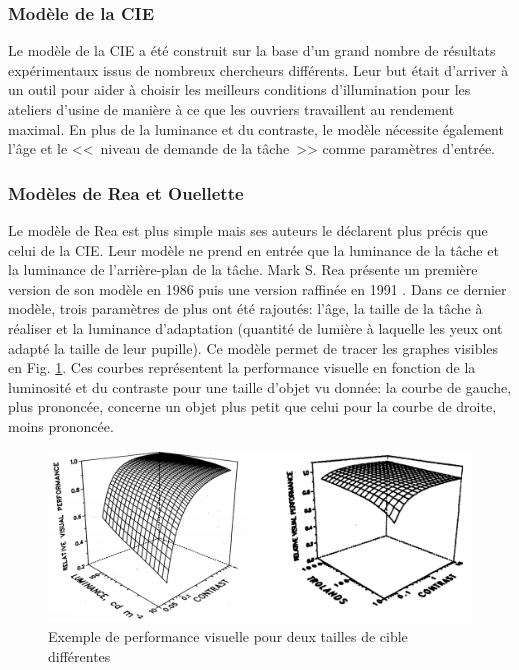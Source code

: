 	\subsubsection{Modèle de la CIE}
	\par Le modèle de la CIE a été construit sur la base d'un grand nombre de résultats expérimentaux issus de nombreux chercheurs différents. Leur but était d'arriver à un outil pour aider à choisir les meilleurs conditions d'illumination pour les ateliers d'usine de manière à ce que les ouvriers travaillent au rendement maximal. En plus de la luminance et du contraste, le modèle nécessite également l'âge et le <<~niveau de demande de la tâche~>> comme paramètres d'entrée.
	
	\subsubsection{Modèles de Rea et Ouellette}
	\par Le modèle de Rea est plus simple mais ses auteurs le déclarent plus précis que celui de la CIE. Leur modèle ne prend en entrée que la luminance de la tâche et la luminance de l'arrière-plan de la tâche. Mark S. Rea présente un première version de son modèle en 1986 \citep{rea_toward_1986} puis une version raffinée en 1991 \citep{rea_relative_1991}. Dans ce dernier modèle, trois paramètres de plus ont été rajoutés: l'âge, la taille de la tâche à réaliser et la luminance d'adaptation (quantité de lumière à laquelle les yeux ont adapté la taille de leur pupille). Ce modèle permet de tracer les graphes visibles en Fig. \ref{fig:courbes_rea}. Ces courbes représentent la performance visuelle en fonction de la luminosité et du contraste pour une taille d'objet vu donnée: la courbe de gauche, plus prononcée, concerne un objet plus petit que celui pour la courbe de droite, moins prononcée.
	
	\begin{figure}
		\centering
		\includegraphics[scale=.5]{Figures/CourbesReaExemple}
		\caption{Exemple de performance visuelle pour deux tailles de cible différentes}
		\label{fig:courbes_rea}
	\end{figure}
	
